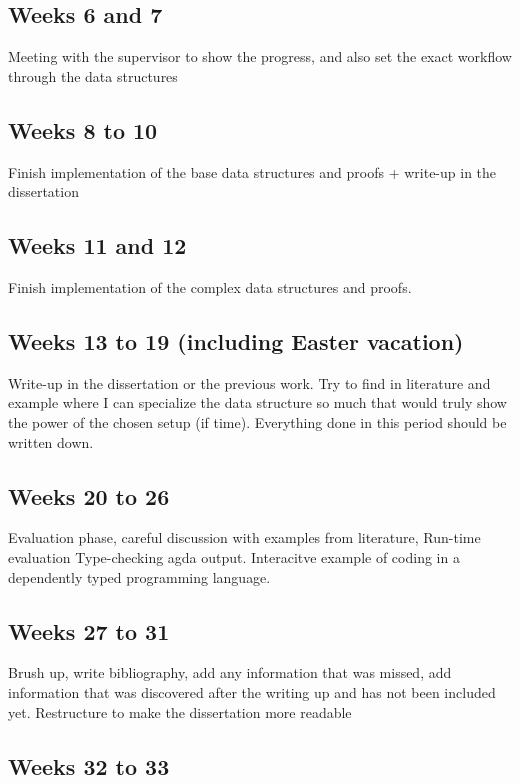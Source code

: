 \documentclass[12pt]{article}
\begin{document}
\subsection*{Weeks 6 and 7}

Meeting with the supervisor to show the progress, and also set the exact workflow
through the data structures

\subsection*{Weeks 8 to 10}

Finish implementation of the base data structures and proofs + write-up in the
dissertation

\subsection*{Weeks 11 and 12}

Finish implementation of the complex data structures and proofs.
\subsection*{Weeks 13 to 19 (including Easter vacation)}

Write-up in the dissertation or the previous work. Try to find in literature and
example where I can specialize the data structure so much that would truly show
the power of the chosen setup (if time). Everything done in this period should
be written down.

\subsection*{Weeks 20 to 26}

Evaluation phase, careful discussion with examples from literature,
Run-time evaluation
Type-checking agda output.
Interacitve example of coding in a dependently typed programming language.

\subsection*{Weeks 27 to 31}

Brush up, write bibliography, add any information that was missed, add information
that was discovered after the writing up and has not been included yet.
Restructure to make the dissertation more readable

\subsection*{Weeks 32 to 33}
\end{document}
